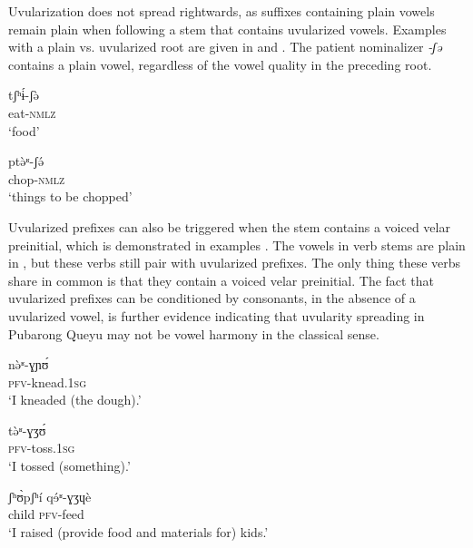 \documentclass[output=paper]{langscibook}
\begin{document}
Uvularization does not spread rightwards, as suffixes containing plain vowels remain plain when following a stem that contains uvularized vowels. Examples with a plain vs. uvularized root are given in  and . The patient nominalizer \textit{{}-ʃə{} } contains a plain vowel, regardless of the vowel quality in the preceding root.

\ea%
    \label{ex:guan:3}
    \gll  tʃʰɨ́-ʃə̀{} \\
  eat-\textsc{nmlz}\\
\glt   ‘food’
    \z

\ea%
    \label{ex:guan:4}
    \gll    ptə̀ʶ-ʃə́{} \\
  chop-\textsc{nmlz}\\
\glt   ‘things to be chopped’
    \z

Uvularized prefixes can also be triggered when the stem contains a voiced velar preinitial, which is demonstrated in examples . The vowels in verb stems are plain in , but these verbs still pair with uvularized prefixes. The only thing these verbs share in common is that they contain a voiced velar preinitial. The fact that uvularized prefixes can be conditioned by consonants, in the absence of a uvularized vowel, is further evidence indicating that uvularity spreading in Pubarong Queyu may not be vowel harmony in the classical sense.

\ea%
    \label{ex:guan:5}
    \gll nə̀ʶ{}-ɣɲʊ́\\
  \textsc{pfv}-knead.1\textsc{sg}\\
\glt   ‘I kneaded (the dough).’
    \z

\ea%
    \label{ex:guan:6}
    \gll tə̀ʶ{}-ɣʒʊ́\\
  \textsc{pfv}-toss.1\textsc{sg}\\
 \glt   ‘I tossed (something).’    \z

\ea%
    \label{ex:guan:7}
    \gll ʃʰʊ̀pʃʰí  qɘ́ʶ-ɣʒɥè\\
  child \textsc{pfv}-feed\\
\glt   ‘I raised (provide food and materials for) kids.’
    \z
\end{document}

